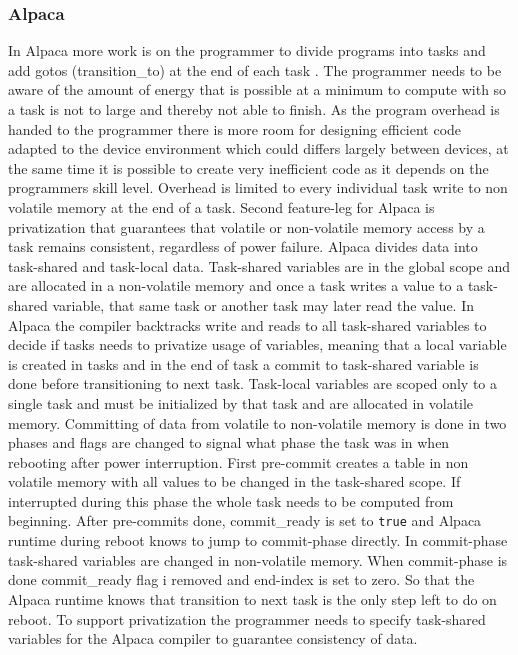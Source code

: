 \documentclass[article,a4paper]{IEEEtran}
\begin{document}
\subsubsection{\textbf{Alpaca}}
In Alpaca more work is on the programmer to divide programs into tasks and add gotos (transition\_to) at the end of each task \cite{Alpaca}. The programmer needs to be aware of the amount of energy that is possible at a minimum to compute with so a task is not to large and thereby not able to finish. As the program overhead is handed to the programmer there is more room for designing efficient code adapted to the device environment which could differs largely between devices, at the same time it is possible to create very inefficient code as it depends on the programmers skill level. Overhead is limited to every individual task write to non volatile memory at the end of a task. Second feature-leg for Alpaca is privatization that guarantees that volatile or non-volatile memory access by a task remains consistent, regardless of power failure. 
\newline\newline
Alpaca divides data into task-shared and task-local data. Task-shared variables are in the global scope and are allocated in a non-volatile memory and once a task writes a value to a task-shared variable, that same task or another task may later read the value. In Alpaca the compiler backtracks write and reads to all task-shared variables to decide if tasks needs to privatize usage of variables, meaning that a local variable is created in tasks and in the end of task a commit to task-shared variable is done before transitioning to next task. Task-local variables are scoped only to a single task and must be initialized by that task and are allocated in volatile memory.
\newline\newline
Committing of data from volatile to non-volatile memory is done in two phases and flags are changed to signal what phase the task was in when rebooting after power interruption. First pre-commit creates a table in non volatile memory with all values to be changed in the task-shared scope. If interrupted during this phase the whole task needs to be computed from beginning. After pre-commits done, commit\_ready is set to \texttt{true} and Alpaca runtime during reboot knows to jump to commit-phase directly. In commit-phase task-shared variables are changed in non-volatile memory. When commit-phase is done commit\_ready flag i removed and end-index is set to zero. So that the Alpaca runtime knows that transition to next task is the only step left to do on reboot. To support privatization the programmer needs to specify task-shared variables for the Alpaca compiler to guarantee consistency of data.
\end{document}

